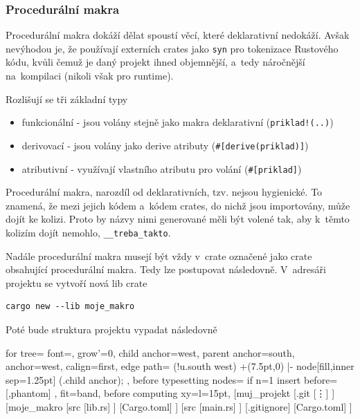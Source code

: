 \documentclass[a4paper, 12pt, twoside]{article} %
\newcommand{\rust}[1]{\texttt{#1}}
\begin{document}
		\subsubsection*{Procedurální makra}
			Procedurální makra dokáží dělat spoustí věcí, které deklarativní nedokáží. Avšak nevýhodou je, že používají externích crates jako \rust{syn} pro tokenizace Rustového kódu, kvůli čemuž je daný projekt ihned objemnější, a~tedy náročnější na~kompilaci (nikoli však pro runtime).
			
			Rozlišují se tři základní typy
			\begin{itemize}
				\item funkcionální - jsou volány stejně jako makra deklarativní (\texttt{priklad!(..)})
				\item derivovací - jsou volány jako derive atributy (\texttt{\#[derive(priklad)]})
				\item atributivní - využívají vlastního atributu pro volání (\texttt{\#[priklad]})
			\end{itemize}
			
			Procedurální makra, narozdíl od deklarativních, tzv. nejsou hygienické. To znamená, že mezi jejich kódem a~kódem crates, do nichž jsou importovány, může dojít ke kolizi. Proto by názvy nimi generované měli být volené tak, aby k~těmto kolizím dojít nemohlo, \rust{__treba_takto}.
			
			Nadále procedurální makra musejí být vždy v~crate označené jako crate obsahující procedurální makra. Tedy lze postupovat následovně. V~adresáři projektu se vytvoří nová lib crate
			\begin{verbatim}
cargo new --lib moje_makro
			\end{verbatim}
			
			Poté bude struktura projektu vypadat následovně
			\begin{center}
				\begin{forest}
					for tree={
					font=\ttfamily,
					grow'=0,
					child anchor=west,
					parent anchor=south,
					anchor=west,
					calign=first,
					edge path={
						\noexpand{}
						(!u.south west) +(7.5pt,0) |- node[fill,inner sep=1.25pt] {} (.child anchor);
					},
					before typesetting nodes={
						if n=1
						{insert before={[,phantom]}}
						{}
					},
					fit=band,
					before computing xy={l=15pt},
					}
				[muj\_projekt
					[.git
					[\vdots]
					]
					[moje\_makro
					[src
						[lib.rs]
					]
					[Cargo.toml]
					]
					[src
					[main.rs]
					]
					[.gitignore]
					[Cargo.toml]
				]
				\end{forest}
			\end{center}
			
\end{document}
